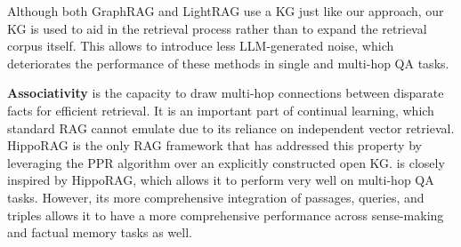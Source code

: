 Although both GraphRAG and LightRAG use a KG just like our \ours approach, our KG is used to aid in the retrieval process rather than to expand the retrieval corpus itself. This allows \ours to introduce less LLM-generated noise, which deteriorates the performance of these methods in single and multi-hop QA tasks.

\noindent \textbf{Associativity} is the capacity to draw multi-hop connections between disparate facts for efficient retrieval. It is an important part of continual learning, which standard RAG cannot emulate due to its reliance on independent vector retrieval. HippoRAG \cite{hipporag} is the only RAG framework that has addressed this property by leveraging the PPR algorithm over an explicitly constructed open KG. \ours is closely inspired by HippoRAG, which allows it to perform very well on multi-hop QA tasks. However, its more comprehensive integration of passages, queries, and triples allows it to have a more comprehensive performance across sense-making and factual memory tasks as well.